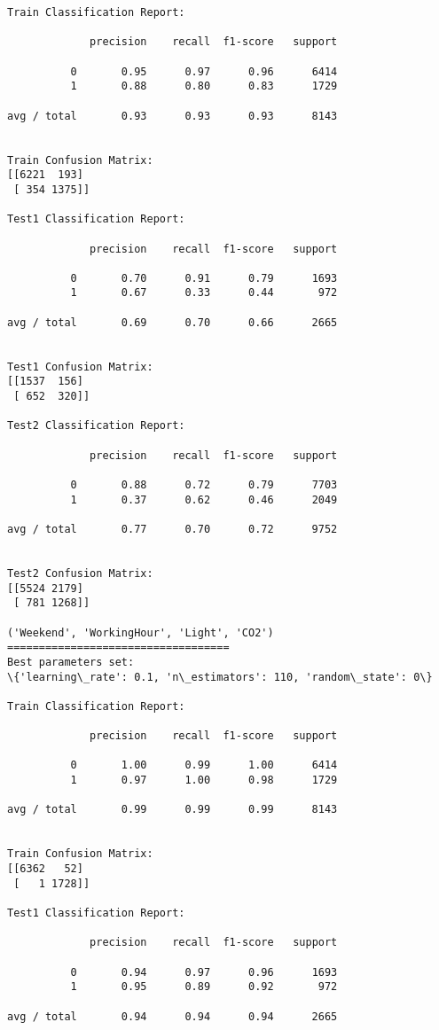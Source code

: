 \documentclass[11pt]{article}
\begin{document}
\begin{Verbatim}[commandchars=\\\{\}]
Train Classification Report:

             precision    recall  f1-score   support

          0       0.95      0.97      0.96      6414
          1       0.88      0.80      0.83      1729

avg / total       0.93      0.93      0.93      8143


Train Confusion Matrix:
[[6221  193]
 [ 354 1375]]

Test1 Classification Report:

             precision    recall  f1-score   support

          0       0.70      0.91      0.79      1693
          1       0.67      0.33      0.44       972

avg / total       0.69      0.70      0.66      2665


Test1 Confusion Matrix:
[[1537  156]
 [ 652  320]]

Test2 Classification Report:

             precision    recall  f1-score   support

          0       0.88      0.72      0.79      7703
          1       0.37      0.62      0.46      2049

avg / total       0.77      0.70      0.72      9752


Test2 Confusion Matrix:
[[5524 2179]
 [ 781 1268]]

('Weekend', 'WorkingHour', 'Light', 'CO2')
===================================
Best parameters set:
\{'learning\_rate': 0.1, 'n\_estimators': 110, 'random\_state': 0\}

Train Classification Report:

             precision    recall  f1-score   support

          0       1.00      0.99      1.00      6414
          1       0.97      1.00      0.98      1729

avg / total       0.99      0.99      0.99      8143


Train Confusion Matrix:
[[6362   52]
 [   1 1728]]

Test1 Classification Report:

             precision    recall  f1-score   support

          0       0.94      0.97      0.96      1693
          1       0.95      0.89      0.92       972

avg / total       0.94      0.94      0.94      2665



\end{Verbatim}
\end{document}
